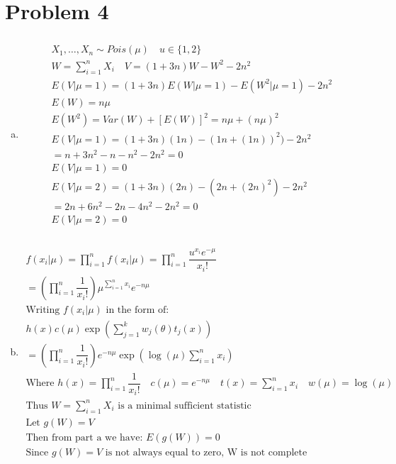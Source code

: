 \documentclass{article}
\newcommand{\sumn}{\sum_{i=1}^{n}}
\newcommand{\prodn}{\prod_{i=1}^{n}}
\newcommand{\sumx}{\sum_{i=1}^{n}x_i}
\begin{document}
\begin{flushleft}
\begin{enumerate}[(a)]
\end{enumerate}

	\section*{Problem 4}
	
\begin{enumerate}[(a)]
	
	\item 	
\begin{multline*}\\
X_1,\dots,X_n\sim Pois(\mu) \quad u\in \{1,2\}\\
W=\sumn X_i \quad V=(1+3n)W-W^2-2n^2\\
E(V|\mu=1)=(1+3n)E(W|\mu=1)-E(W^2|\mu=1)-2n^2\\
E(W)=n\mu\\
E(W^2)=Var(W)+[E(W)]^2=n\mu+(n\mu)^2\\
E(V|\mu=1)=(1+3n)(1n)-(1n+(1n))^2)-2n^2\\
=n+3n^2-n-n^2-2n^2=0\\
E(V|\mu=1)=0\\
E(V|\mu=2)=(1+3n)(2n)-(2n+(2n)^2)-2n^2\\
=2n+6n^2-2n-4n^2-2n^2=0\\
E(V|\mu=2)=0\\
\end{multline*}

\pagebreak
	\item 
\begin{multline*}\\
f(x_i|\mu)=\prodn f(x_i|\mu)=\prodn \dfrac{u^{x_i}e^{-\mu}}{x_i!}\\
=\left(\prodn \dfrac{1}{x_i!}\right) \mu^{\sumx}e^{-n\mu}\\
\text{Writing } f(x_i|\mu) \text{ in the form of:}\\
h(x)c(\mu)\exp\left(\sum_{j=1}^{k}w_j(\theta)t_j(x)\right)\\
=\left(\prodn \dfrac{1}{x_i!}\right)e^{-n\mu}\exp\left(\log(\mu)\sumx\right)\\
\text{Where } h(x)=\prodn \dfrac{1}{x_i!}\quad
c(\mu)=e^{-n\mu}\quad t(x)=\sumx \quad w(\mu)=\log(\mu)\\
\text{Thus } W=\sumn X_i \text{ is a minimal sufficient statistic}\\
\text{Let } g(W)=V\\
\text{Then from part a we have: } E(g(W))=0\\
\text{Since } g(W)=V \text{ is not always equal to zero, W is not complete}\\
\end{multline*}


\end{enumerate}
\end{flushleft}
\end{document}
